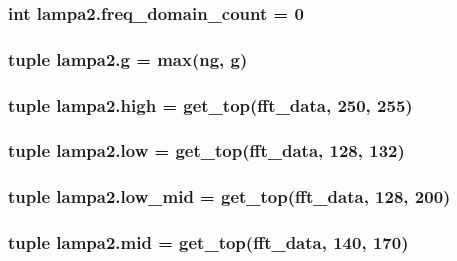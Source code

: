 \subsubsection[{freq\+\_\+domain\+\_\+count}]{\setlength{\rightskip}{0pt plus 5cm}int lampa2.\+freq\+\_\+domain\+\_\+count = 0}\label{namespacelampa2_a9bb8fdc41ec8a48e18b36891175c745d}
\hypertarget{namespacelampa2_ad96d600a7363b39dd3e8029e68a70e32}{}
\subsubsection[{g}]{\setlength{\rightskip}{0pt plus 5cm}tuple lampa2.\+g = max({\bf ng}, g)}\label{namespacelampa2_ad96d600a7363b39dd3e8029e68a70e32}
\hypertarget{namespacelampa2_a8f36218af5f002947063519cf953b9ef}{}
\subsubsection[{high}]{\setlength{\rightskip}{0pt plus 5cm}tuple lampa2.\+high = {\bf get\+\_\+top}({\bf fft\+\_\+data}, 250, 255)}\label{namespacelampa2_a8f36218af5f002947063519cf953b9ef}
\hypertarget{namespacelampa2_afc6a24941cf04cc521960968ff7ccb08}{}
\subsubsection[{low}]{\setlength{\rightskip}{0pt plus 5cm}tuple lampa2.\+low = {\bf get\+\_\+top}({\bf fft\+\_\+data}, 128, 132)}\label{namespacelampa2_afc6a24941cf04cc521960968ff7ccb08}
\hypertarget{namespacelampa2_a1e1a1f6470f623e1e30ceda1b006de00}{}
\subsubsection[{low\+\_\+mid}]{\setlength{\rightskip}{0pt plus 5cm}tuple lampa2.\+low\+\_\+mid = {\bf get\+\_\+top}({\bf fft\+\_\+data}, 128, 200)}\label{namespacelampa2_a1e1a1f6470f623e1e30ceda1b006de00}
\hypertarget{namespacelampa2_af8c3daba100afcfcba0f78e87d857de3}{}
\subsubsection[{mid}]{\setlength{\rightskip}{0pt plus 5cm}tuple lampa2.\+mid = {\bf get\+\_\+top}({\bf fft\+\_\+data}, 140, 170)}\label{namespacelampa2_af8c3daba100afcfcba0f78e87d857de3}
\hypertarget{namespacelampa2_ae7917682e1f41e81083f6c39c5224ced}{}
